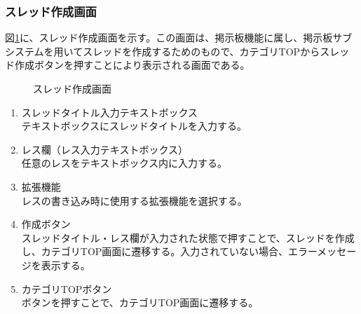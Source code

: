 \documentclass[a4j]{jarticle}
\begin{document}
\subsubsection{スレッド作成画面}
図\ref{fig:make_thread}に、スレッド作成画面を示す。この画面は、掲示板機能に属し、掲示板サブシステムを用いてスレッドを作成するためのもので、カテゴリTOPからスレッド作成ボタンを押すことにより表示される画面である。\\
\begin{figure}[H]
\centering
{}
\caption{スレッド作成画面}
\label{fig:make_thread}
\end{figure}

\begin{enumerate}
  \renewcommand{\labelenumi}{\textcircled{\scriptsize \theenumi}}

\item スレッドタイトル入力テキストボックス\\
テキストボックスにスレッドタイトルを入力する。

\item レス欄（レス入力テキストボックス）\\
任意のレスをテキストボックス内に入力する。

\item 拡張機能\\
レスの書き込み時に使用する拡張機能を選択する。

\item 作成ボタン\\
スレッドタイトル・レス欄が入力された状態で押すことで、スレッドを作成し、カテゴリTOP画面に遷移する。入力されていない場合、エラーメッセージを表示する。

\item カテゴリTOPボタン\\
  ボタンを押すことで、カテゴリTOP画面に遷移する。

\end{enumerate}
\end{document}
